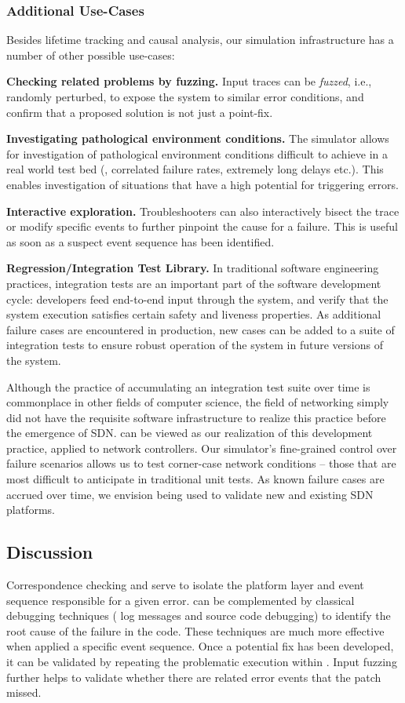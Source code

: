 \subsubsection{Additional Use-Cases} Besides lifetime tracking and causal analysis, our simulation infrastructure has a
number of other possible use-cases:

\noindent\textbf{Checking related problems by fuzzing.} Input traces can be \emph{fuzzed}, i.e.,
randomly perturbed, to expose the system to similar error conditions, and confirm
that a proposed solution is not just a point-fix.

\noindent\textbf{Investigating pathological environment conditions.} The simulator allows for investigation
of pathological environment conditions difficult to achieve in a real world test bed
(\eg{}, correlated failure rates, extremely long delays etc.). This enables
investigation of situations that have a high potential for triggering errors.

\noindent\textbf{Interactive exploration.} Troubleshooters can also interactively bisect
the trace or modify specific events to further pinpoint the cause for a failure.
This is useful as soon as a suspect event sequence has been identified.

\noindent\textbf{Regression/Integration Test Library.} In traditional software engineering practices,
integration tests are an
important part of the software development cycle: developers feed end-to-end
input through the system, and verify that the system execution satisfies
certain safety and liveness properties. As additional failure cases are encountered in
production, new cases can be added to a suite of integration tests to
ensure robust operation of the system in future versions of the system.

Although the practice of accumulating an integration test suite over time is
commonplace in other fields of computer science, the field of networking
simply did not have the requisite software infrastructure to realize this practice before the emergence
of SDN. \Simulator{} can be viewed as our realization
of this development practice, applied to network controllers. Our simulator's fine-grained control over
failure scenarios allows us to test corner-case network conditions -- those
that are most difficult to anticipate in traditional unit tests.
As known failure cases are accrued over time, we envision \simulator{} being used to validate
new and existing SDN platforms. 

\subsection{Discussion}

Correspondence checking and \simulator{} serve to isolate the platform layer and
event sequence responsible for a given error. \projectname{} can be
complemented by classical debugging techniques (\eg{} log messages and source
code debugging) to identify the root cause of
the failure in the code. These techniques are much more
effective when applied a specific event sequence. Once a
potential fix has been developed, it can be validated by repeating the
problematic execution within \projectname{}. Input fuzzing further helps to
validate whether there are 
related error events that the patch missed.
